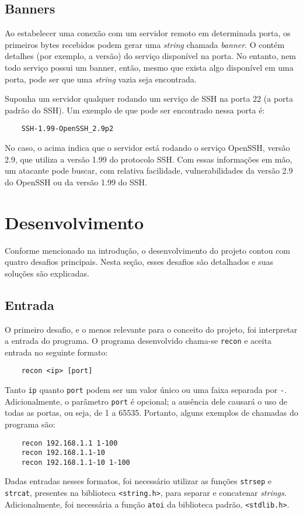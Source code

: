 \documentclass{sig-alternate-05-2015}
\begin{document}
\subsection{Banners}

Ao estabelecer uma conexão com um servidor remoto em determinada porta, os primeiros bytes recebidos podem gerar uma \textit{string} chamada \textit{banner}.
O \banner contém detalhes (por exemplo, a versão) do serviço disponível na porta.
No entanto, nem todo serviço possui um banner, então, mesmo que exista algo disponível em uma porta, pode ser que uma \textit{string} vazia seja encontrada.

Suponha um servidor qualquer rodando um serviço de SSH na porta 22 (a porta padrão do SSH).
Um exemplo de \banner que pode ser encontrado nessa porta é:
\begin{verbatim}
	SSH-1.99-OpenSSH_2.9p2
\end{verbatim}

No caso, o \banner acima indica que o servidor está rodando o serviço OpenSSH, versão 2.9, que utiliza a versão 1.99 do protocolo SSH.
Com essas informações em mão, um atacante pode buscar, com relativa facilidade, vulnerabilidades da versão 2.9 do OpenSSH ou da versão 1.99 do SSH.

\section{Desenvolvimento}
Conforme mencionado na introdução, o desenvolvimento do projeto contou com quatro desafios principais. Nesta seção, esses desafios são detalhados e suas soluções são explicadas.

\subsection{Entrada}
O primeiro desafio, e o menos relevante para o conceito do projeto, foi interpretar a entrada do programa. O programa desenvolvido chama-se \texttt{recon} e aceita entrada no seguinte formato:
\begin{verbatim}
	recon <ip> [port]
\end{verbatim}
Tanto \texttt{ip} quanto \texttt{port} podem ser um valor único ou uma faixa separada por \texttt{-}.
Adicionalmente, o parâmetro \texttt{port} é opcional; a ausência dele causará o uso de todas as portas, ou seja, de 1 a 65535.
Portanto, alguns exemplos de chamadas do programa são:
\begin{verbatim}
	recon 192.168.1.1 1-100
	recon 192.168.1.1-10
	recon 192.168.1.1-10 1-100
\end{verbatim}
Dadas entradas nesses formatos, foi necessário utilizar as funções \texttt{strsep} e \texttt{strcat}, presentes na biblioteca \texttt{<string.h>}, para separar e concatenar \textit{strings}.
Adicionalmente, foi necessária a função \texttt{atoi} da biblioteca padrão, \texttt{<stdlib.h>}.
\end{document}
